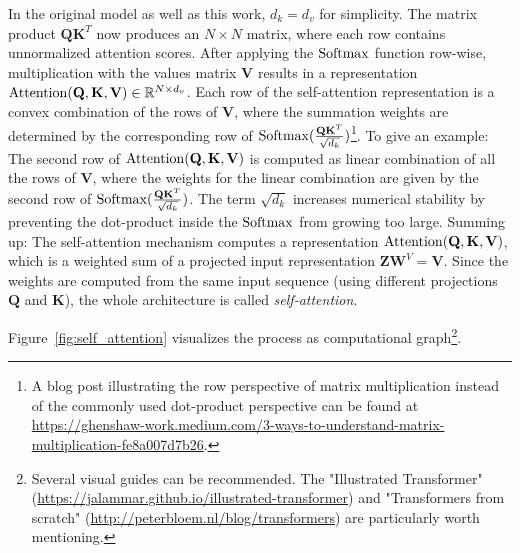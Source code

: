 In the original model as well as this work, $d_k = d_v$ for simplicity. The matrix product $\mathbf Q \mathbf K^T$ now produces an $N \times N$ matrix, where each row contains unnormalized attention scores. After applying the $\operatorname{Softmax}$ function row-wise, multiplication with the values matrix $\mathbf V$ results in a representation $\operatorname{Attention} (\mathbf Q, \mathbf K, \mathbf V) \in \mathbb R^{N \times d_v}$. Each row of the self-attention representation is a convex combination of the rows of $\mathbf V$, where the summation weights are determined by the corresponding row of $\operatorname{Softmax} ( \frac{\mathbf Q \mathbf K^T}{\sqrt{d_k}} )$\footnote{A blog post illustrating the row perspective of matrix multiplication instead of the commonly used dot-product perspective can be found at \href{https://ghenshaw-work.medium.com/3-ways-to-understand-matrix-multiplication-fe8a007d7b26}{https://ghenshaw-work.medium.com/3-ways-to-understand-matrix-multiplication-fe8a007d7b26}.}. To give an example: The second row of $\operatorname{Attention} (\mathbf Q, \mathbf K, \mathbf V)$ is computed as linear combination of all the rows of $\mathbf V$, where the weights for the linear combination are given by the second row of $\operatorname{Softmax} ( \frac{\mathbf Q \mathbf K^T}{\sqrt{d_k}} )$. The term $\sqrt{d_k}$ increases numerical stability by preventing the dot-product inside the $\operatorname{Softmax}$ from growing too large. Summing up: The self-attention mechanism computes a representation $\operatorname{Attention} (\mathbf Q, \mathbf K, \mathbf V)$, which is a weighted sum of a projected input representation $\mathbf Z \mathbf W^V = \mathbf V$. Since the weights are computed from the same input sequence (using different projections $\mathbf Q$ and $\mathbf K$), the whole architecture is called \emph{self-attention}. 

Figure~\ref{fig:self_attention} visualizes the process as computational graph\footnote{Several visual guides can be recommended. The "Illustrated Transformer" (\href{https://jalammar.github.io/illustrated-transformer}{https://jalammar.github.io/illustrated-transformer}) and "Transformers from scratch" (\href{http://peterbloem.nl/blog/transformers}{http://peterbloem.nl/blog/transformers}) are particularly worth mentioning.}.

